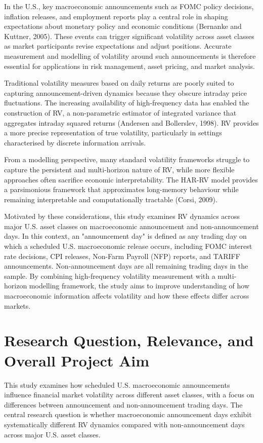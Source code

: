 \documentclass[12pt,a4paper]{report}
\begin{document}
In the U.S., key macroeconomic announcements such as FOMC policy decisions, inflation releases, and employment reports play a central role in shaping expectations about monetary policy and economic conditions (Bernanke and Kuttner, 2005). These events can trigger significant volatility across asset classes as market participants revise expectations and adjust positions. Accurate measurement and modelling of volatility around such announcements is therefore essential for applications in risk management, asset pricing, and market analysis.

Traditional volatility measures based on daily returns are poorly suited to capturing announcement-driven dynamics because they obscure intraday price fluctuations. The increasing availability of high-frequency data has enabled the construction of RV, a non-parametric estimator of integrated variance that aggregates intraday squared returns (Andersen and Bollerslev, 1998). RV provides a more precise representation of true volatility, particularly in settings characterised by discrete information arrivals.

From a modelling perspective, many standard volatility frameworks struggle to capture the persistent and multi-horizon nature of RV, while more flexible approaches often sacrifice economic interpretability. The HAR-RV model provides a parsimonious framework that approximates long-memory behaviour while remaining interpretable and computationally tractable (Corsi, 2009).

Motivated by these considerations, this study examines RV dynamics across major U.S. asset classes on macroeconomic announcement and non-announcement days. In this context, an "announcement day" is defined as any trading day on which a scheduled U.S. macroeconomic release occurs, including FOMC interest rate decisions, CPI releases, Non-Farm Payroll (NFP) reports, and TARIFF announcements. Non-announcement days are all remaining trading days in the sample. By combining high-frequency volatility measurement with a multi-horizon modelling framework, the study aims to improve understanding of how macroeconomic information affects volatility and how these effects differ across markets.

\section{Research Question, Relevance, and Overall Project Aim}
This study examines how scheduled U.S. macroeconomic announcements influence financial market volatility across different asset classes, with a focus on differences between announcement and non-announcement trading days. The central research question is whether macroeconomic announcement days exhibit systematically different RV dynamics compared with non-announcement days across major U.S. asset classes.
\end{document}
